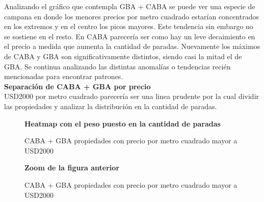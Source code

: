 \documentclass[a4paper, 10pt]{article}
\newcommand\tab[1][0.5cm]{\hspace*{#1}}
\begin{document}
				
				Analizando el gráfico que contempla GBA + CABA se puede ver una especie de campana en donde 
				los menores precios por metro cuadrado estarían concentrados en los extremos y en el centro 
				los picos mayores. Este tendencia sin embargo no se sostiene en el resto. En CABA parecería 
				ser como hay un leve decaimiento en el precio a medida que aumenta la cantidad de paradas. 
				Nuevamente los máximos de CABA y GBA son significativamente distintos, siendo casi la mitad 
				el de GBA. Se continua analizando las distintas anomalías o tendencias recién mencionadas 
				para encontrar patrones.\\
				
				\textbf{Separación de CABA + GBA por precio}\\
				\tab\textdollar USD2000 por metro cuadrado parecería ser una linea prudente por la cual 
				dividir las propiedades y analizar la distribución en la cantidad de paradas. 

				\begin{figure}[H]
    				\centering
    				\textbf{Heatmap con el peso puesto en la cantidad de paradas}\par\medskip
    				\caption{CABA + GBA propiedades con precio por metro cuadrado mayor a \textdollar USD2000}
				\end{figure}
				\begin{figure}[H]
    				\centering
    				\textbf{Zoom de la figura anterior}\par\medskip
    				\caption{CABA + GBA propiedades con precio por metro cuadrado mayor a \textdollar USD2000}
				\end{figure}								
				
\end{document}
